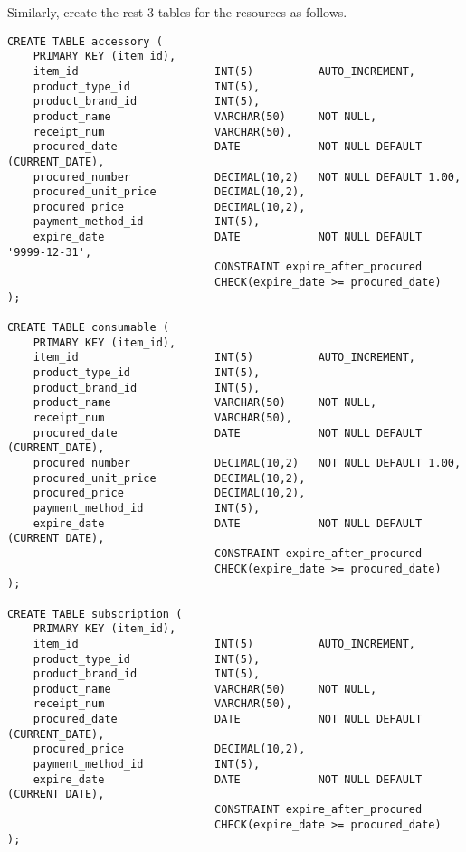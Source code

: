 Similarly, create the rest 3 tables for the resources as follows.
\begin{lstlisting}
CREATE TABLE accessory (
    PRIMARY KEY (item_id),
    item_id                     INT(5)          AUTO_INCREMENT,
    product_type_id             INT(5),
    product_brand_id            INT(5),
    product_name                VARCHAR(50)     NOT NULL,
    receipt_num                 VARCHAR(50),
    procured_date               DATE            NOT NULL DEFAULT (CURRENT_DATE),
    procured_number             DECIMAL(10,2)   NOT NULL DEFAULT 1.00,
    procured_unit_price         DECIMAL(10,2),
    procured_price              DECIMAL(10,2),
    payment_method_id           INT(5),
    expire_date                 DATE            NOT NULL DEFAULT '9999-12-31',
                                CONSTRAINT expire_after_procured
                                CHECK(expire_date >= procured_date)
);

CREATE TABLE consumable (
    PRIMARY KEY (item_id),
    item_id                     INT(5)          AUTO_INCREMENT,
    product_type_id             INT(5),
    product_brand_id            INT(5),
    product_name                VARCHAR(50)     NOT NULL,
    receipt_num                 VARCHAR(50),
    procured_date               DATE            NOT NULL DEFAULT (CURRENT_DATE),
    procured_number             DECIMAL(10,2)   NOT NULL DEFAULT 1.00,
    procured_unit_price         DECIMAL(10,2),
    procured_price              DECIMAL(10,2),
    payment_method_id           INT(5),
    expire_date                 DATE            NOT NULL DEFAULT (CURRENT_DATE),
                                CONSTRAINT expire_after_procured
                                CHECK(expire_date >= procured_date)
);

CREATE TABLE subscription (
    PRIMARY KEY (item_id),
    item_id                     INT(5)          AUTO_INCREMENT,
    product_type_id             INT(5),
    product_brand_id            INT(5),
    product_name                VARCHAR(50)     NOT NULL,
    receipt_num                 VARCHAR(50),
    procured_date               DATE            NOT NULL DEFAULT (CURRENT_DATE),
    procured_price              DECIMAL(10,2),
    payment_method_id           INT(5),
    expire_date                 DATE            NOT NULL DEFAULT (CURRENT_DATE),
                                CONSTRAINT expire_after_procured
                                CHECK(expire_date >= procured_date)
);
\end{lstlisting}

